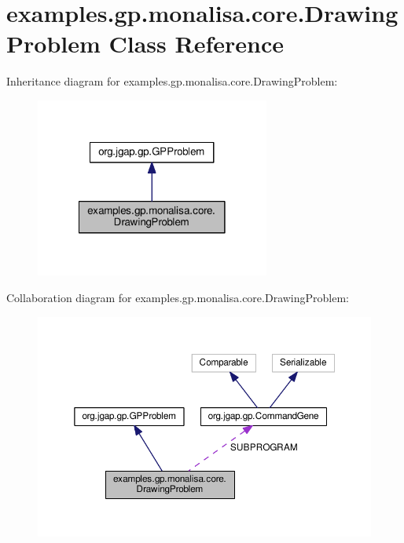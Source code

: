 \hypertarget{classexamples_1_1gp_1_1monalisa_1_1core_1_1_drawing_problem}{\section{examples.\-gp.\-monalisa.\-core.\-Drawing\-Problem Class Reference}
\label{classexamples_1_1gp_1_1monalisa_1_1core_1_1_drawing_problem}
}


Inheritance diagram for examples.\-gp.\-monalisa.\-core.\-Drawing\-Problem\-:
\nopagebreak
\begin{figure}[H]
\begin{center}
\leavevmode
\includegraphics[width=218pt]{classexamples_1_1gp_1_1monalisa_1_1core_1_1_drawing_problem__inherit__graph}
\end{center}
\end{figure}


Collaboration diagram for examples.\-gp.\-monalisa.\-core.\-Drawing\-Problem\-:
\nopagebreak
\begin{figure}[H]
\begin{center}
\leavevmode
\includegraphics[width=350pt]{classexamples_1_1gp_1_1monalisa_1_1core_1_1_drawing_problem__coll__graph}
\end{center}
\end{figure}
